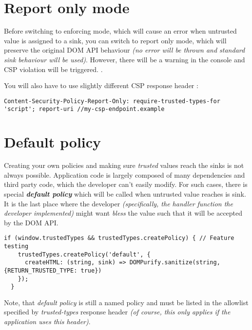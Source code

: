 \section{Report only mode}

Before switching to enforcing mode, which will cause an error when untrusted value is assigned to a
sink, you can switch to report only mode, which will preserve the original DOM API behaviour
\emph{(no error will be thrown and standard sink behaviour will be used)}. However, there will be a
warning in the console and CSP violation will be triggered. \cite{tt_intro_csp_violation}.

You will also have to use slightly different CSP response header \cite{trusted_types_into}:

\bigskip
\begin{lstlisting}[language={}, caption={Report only CSP}]
  Content-Security-Policy-Report-Only: require-trusted-types-for 'script'; report-uri //my-csp-endpoint.example
\end{lstlisting}

\section{Default policy}

Creating your own policies and making sure \emph{trusted} values reach the sinks is not always
possible. Application code is largely composed of many dependencies and third party code, which the
developer can't easily modify. For such cases, there is special \emph{\textbf{default policy}} which
will be called when untrusted value reaches is sink. It is the last place where the developer
\emph{(specifically, the handler function the developer implemented)} might want \emph{bless} the
value such that it will be accepted by the DOM API. \cite{trusted_types_into}

\bigskip
\begin{lstlisting}[language=ES6, caption={Creating default policy}]
  if (window.trustedTypes && trustedTypes.createPolicy) { // Feature testing
    trustedTypes.createPolicy('default', {
      createHTML: (string, sink) => DOMPurify.sanitize(string, {RETURN_TRUSTED_TYPE: true})
    });
  }
\end{lstlisting}

Note, that \emph{default policy} is still a named policy and must be listed in the allowlist
specified by \emph{trusted-types} response header \emph{(of course, this only applies if the
  application uses this header)}.

